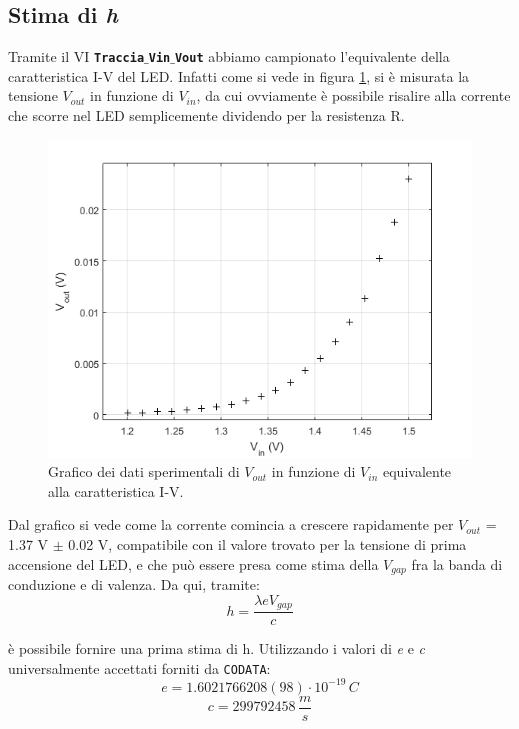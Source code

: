 \documentclass[journal, a4paper]{IEEEtran}
\begin{document}
\subsection{Stima di \textit{h}} 
Tramite il VI \textbf{\texttt{Traccia$\_$Vin$\_$Vout}} abbiamo campionato l'equivalente della caratteristica I-V del LED. Infatti come si vede in figura \ref{fig:ledcar}, si è misurata la tensione $V_{out}$ in funzione di $V_{in}$, da cui ovviamente è possibile risalire alla corrente che scorre nel LED semplicemente dividendo per la resistenza R. \\

\begin{figure}[htp]
\centering
\includegraphics[scale=.6]{graph_led}
\caption{Grafico dei dati sperimentali di $V_{out}$ in funzione di $V_{in}$ equivalente alla caratteristica I-V.}
\label{fig:ledcar}
\end{figure}

Dal grafico si vede come la corrente comincia a crescere rapidamente per $V_{out}$ = 1.37 V $\pm$ 0.02 V, compatibile con il valore trovato per la tensione di prima accensione del LED, e che può essere presa come stima della $V_{gap}$ fra la banda di conduzione e di valenza. Da qui, tramite:
\begin{equation}
h = \frac{\lambda e V_{gap}}{c}
\end{equation}

è possibile fornire una prima stima di h. Utilizzando i valori di \textit{e} e \textit{c} universalmente accettati forniti da \texttt{CODATA}:
\begin{equation}
e = 1.6021766208(98) \cdot 10^{-19} \, C
\end{equation}
\begin{equation}
c = 299 792 458 \, \frac{m}{s}
\end{equation}
\end{document}
